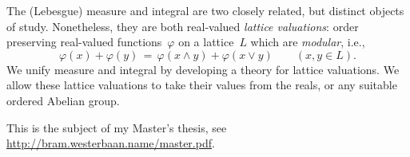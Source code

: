 \printtitleinfo

The (Lebesgue) measure and integral are two closely related,
but distinct objects of study.
Nonetheless,
they are both real-valued \emph{lattice valuations}:
order preserving real-valued functions~$\varphi$
on a lattice~$L$
which are \emph{modular}, i.e.,
\begin{equation*}
\varphi(x) + \varphi(y) 
\,=\, 
\varphi(x\wedge y) + \varphi(x\vee y)\qquad(x,y\in L).
\end{equation*}
We unify measure and integral
by developing a theory for lattice valuations.
We allow these lattice valuations
to take their values from the reals,
or any suitable ordered Abelian group.

\medskip

This is the subject of my Master's thesis,
see \url{http://bram.westerbaan.name/master.pdf}.
